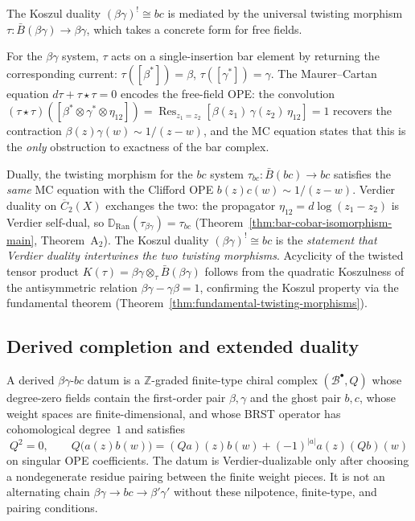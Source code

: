 \begin{remark}
\label{rem:free-field-twisting}
The Koszul duality $(\beta\gamma)^! \cong bc$ is mediated by the
universal twisting morphism
$\tau\colon \bar{B}(\beta\gamma) \to \beta\gamma$,
which takes a concrete form for free fields.

For the $\beta\gamma$ system, $\tau$ acts on a single-insertion
bar element by returning the corresponding current:
$\tau([\beta^*]) = \beta$, $\tau([\gamma^*]) = \gamma$.
The Maurer--Cartan equation $d\tau + \tau \star \tau = 0$
encodes the free-field OPE: the convolution
$(\tau \star \tau)([\beta^* \otimes \gamma^* \otimes \eta_{12}])
= \operatorname{Res}_{z_1 = z_2}[\beta(z_1)\,\gamma(z_2)\,\eta_{12}]
= 1$
recovers the contraction $\beta(z)\gamma(w) \sim 1/(z-w)$,
and the MC equation states that this is the \emph{only}
obstruction to exactness of the bar complex.

Dually, the twisting morphism for the $bc$ system
$\tau_{bc}\colon \bar{B}(bc) \to bc$ satisfies the
\emph{same} MC equation with the Clifford
OPE $b(z)c(w) \sim 1/(z-w)$. Verdier duality on
$\overline{C}_2(X)$ exchanges the two: the propagator
$\eta_{12} = d\log(z_1 - z_2)$ is Verdier self-dual, so
$\mathbb{D}_{\mathrm{Ran}}(\tau_{\beta\gamma})
= \tau_{bc}$
(Theorem~\ref{thm:bar-cobar-isomorphism-main},
Theorem~A$_2$).
The Koszul duality $(\beta\gamma)^! \cong bc$ is the
\emph{statement that Verdier duality intertwines the two
twisting morphisms}. Acyclicity of the twisted tensor product
$K(\tau) = \beta\gamma \otimes_\tau \bar{B}(\beta\gamma)$
follows from the quadratic Koszulness of the antisymmetric
relation $\beta\gamma - \gamma\beta = 1$, confirming the
Koszul property via the fundamental theorem
(Theorem~\ref{thm:fundamental-twisting-morphisms}).
\end{remark}


\subsection{Derived completion and extended duality}

\begin{definition}\label{def:derived-bg-bc}
A derived $\beta\gamma$-$bc$ datum is a $\mathbb Z$-graded
finite-type chiral complex
$(\mathcal B^\bullet,Q)$ whose degree-zero fields contain the
first-order pair $\beta,\gamma$ and the ghost pair $b,c$, whose
weight spaces are finite-dimensional, and whose BRST operator has
cohomological degree~$1$ and satisfies
\[
Q^2=0,\qquad
Q\bigl(a(z)b(w)\bigr)
= (Qa)(z)b(w)+(-1)^{|a|}a(z)(Qb)(w)
\]
on singular OPE coefficients. The datum is Verdier-dualizable only
after choosing a nondegenerate residue pairing between the finite
weight pieces. It is not an alternating chain
$\beta\gamma\to bc\to\beta'\gamma'$ without these nilpotence,
finite-type, and pairing conditions.
\end{definition}

